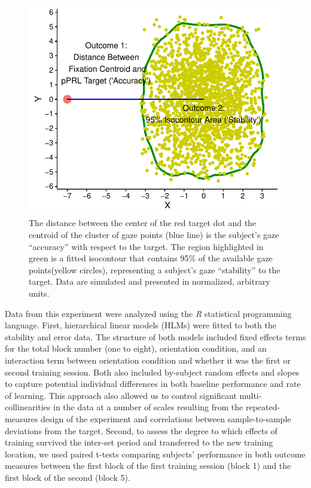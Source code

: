 \begin{figure}[!htbp]
\centering
\includegraphics[width=.75\linewidth,height=.75\textheight,keepaspectratio]{figures/chapter_1/outcomes_figure.pdf}
\caption[Schematic Depiction of Outcome Measures and Their Relationship for All Experiments.]{The distance between the center of the red target dot and the centroid of the cluster of gaze points (blue line) is the subject's gaze ``accuracy'' with respect to the target. The region highlighted in green is a fitted isocontour that contains 95\% of the available gaze points(yellow circles), representing a subject's gaze ``stability'' to the target. Data are simulated and presented in normalized, arbitrary units.}\label{chap_1_outcome_figure}
\end{figure}

Data from this experiment were analyzed using the \textit{R} statistical programming language. First, hierarchical linear models (HLMs) were fitted to both the stability and error data. The structure of both models included fixed effects terms for the total block number (one to eight), orientation condition, and an interaction term between orientation condition and whether it was the first or second training session. Both also included by-subject random effects and slopes to capture potential individual differences in both baseline performance and rate of learning. This approach also allowed us to control significant multi-collinearities in the data at a number of scales resulting from the repeated-measures design of the experiment and correlations between sample-to-sample deviations from the target. Second, to assess the degree to which effects of training survived the inter-set period and transferred to the new training location, we used paired t-tests comparing subjects' performance in both outcome measures between the first block of the first training session (block 1) and the first block of the second (block 5). 

